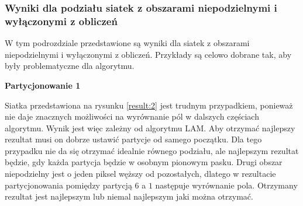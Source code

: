 \subsubsection{Wyniki dla podziału siatek z obszarami niepodzielnymi i wyłączonymi z obliczeń}
W tym podrozdziale przedstawione są wyniki dla siatek z obszarami niepodzielnymi i wyłączonymi
z obliczeń.
Przykłady są celowo dobrane tak, aby były problematyczne dla algorytmu.

\vspace{3mm}
\textbf{Partycjonowanie 1}
\vspace{1mm}

Siatka przedstawiona na rysunku \ref{result:2} jest trudnym przypadkiem, ponieważ nie daje znacznych możliwości na wyrównanie pól
w dalszych częściach algorytmu.
Wynik jest więc zależny od algorytmu LAM.
Aby otrzymać najlepszy rezultat musi on dobrze ustawić partycje od samego początku.
Dla tego przypadku nie da się otrzymać idealnie równego podziału, ale najlepszym rezultat będzie, gdy każda partycja będzie
w osobnym pionowym pasku.
Drugi obszar niepodzielny jest o jeden piksel węższy od pozostałych, dlatego w rezultacie partycjonowania pomiędzy partycją
$6$ a $1$ następuje wyrównanie pola.
Otrzymany rezultat jest najlepszym lub niemal najlepszym jaki można otrzymać.

